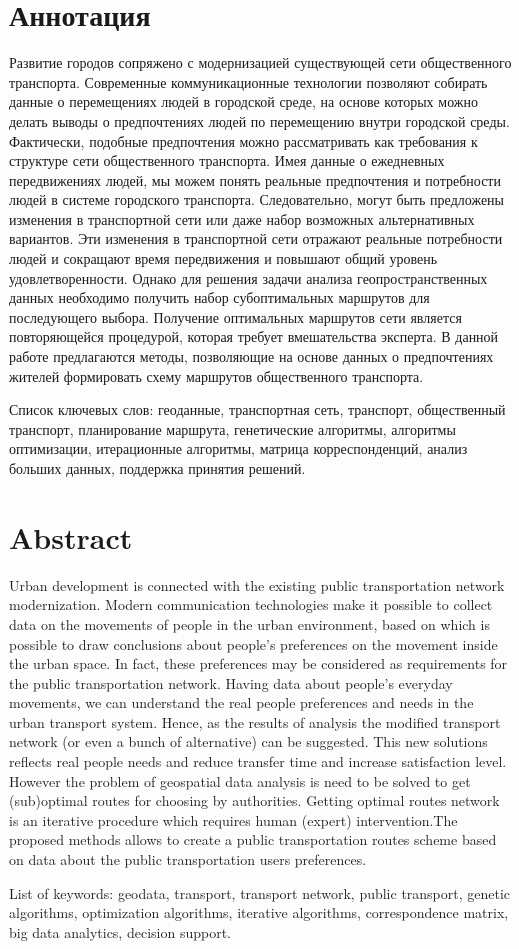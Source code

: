\tocless\part{Аннотация}
Развитие городов сопряжено с модернизацией существующей сети общественного транспорта. Современные 
коммуникационные технологии позволяют собирать данные о перемещениях людей в городской среде, на основе 
которых можно делать выводы о предпочтениях людей по перемещению внутри городской среды. Фактически, 
подобные предпочтения можно рассматривать как требования к структуре сети общественного транспорта. 
Имея данные о ежедневных передвижениях людей, мы можем понять реальные предпочтения и потребности людей 
в системе городского транспорта. Следовательно, могут быть предложены изменения в транспортной сети или 
даже набор возможных альтернативных вариантов. Эти изменения в транспортной сети отражают реальные 
потребности людей и сокращают время передвижения и повышают общий уровень удовлетворенности. Однако для 
решения задачи анализа геопространственных данных необходимо получить набор субоптимальных маршрутов для 
последующего выбора. Получение оптимальных маршрутов сети является повторяющейся процедурой, которая требует 
вмешательства эксперта. В данной работе предлагаются методы, позволяющие на основе данных о предпочтениях 
жителей формировать схему маршрутов общественного транспорта.

Список ключевых слов: геоданные, транспортная сеть, транспорт, общественный транспорт, планирование маршрута, 
генетические алгоритмы, алгоритмы оптимизации, итерационные алгоритмы, матрица корреспонденций, анализ 
больших данных, поддержка принятия решений.

\tocless\part{Abstract}
Urban development is connected with the existing public transportation network modernization. Modern 
communication technologies make it possible to collect data on the movements of people in the urban 
environment, based on which is possible to draw conclusions about people's preferences on the movement 
inside the urban space. In fact, these preferences may be considered as requirements for the public 
transportation network. Having data about people's everyday movements, we can understand the real people 
preferences and needs in the urban transport system. Hence, as the results of analysis the modified transport 
network (or even a bunch of alternative) can be suggested. This new solutions reflects real people needs and 
reduce transfer time and increase satisfaction level. However the problem of geospatial data analysis is need 
to be solved to get (sub)optimal routes for choosing by authorities. Getting optimal routes network is an 
iterative procedure which requires human (expert) intervention.The proposed methods allows to create a public 
transportation routes scheme based on data about the public transportation users preferences.

List of keywords: geodata, transport, transport network, public transport, genetic algorithms, optimization 
algorithms, iterative algorithms, correspondence matrix, big data analytics, decision support.